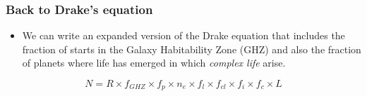 \begin{frame}
\frametitle{Back to Drake's equation}

\begin{itemize}
\item We can write an expanded version of the Drake equation that includes the fraction of starts in the Galaxy Habitability Zone (GHZ) and also the fraction of planets where life has emerged in which {\em complex life} arise. 
\end{itemize}

\begin{block}{}

$$
N = R \times f_{GHZ} \times f_p \times n_e \times f_l \times f_{cl} \times f_i   \times f_c \times L
$$

\end{block}

\end{frame}
%
%
%
%

